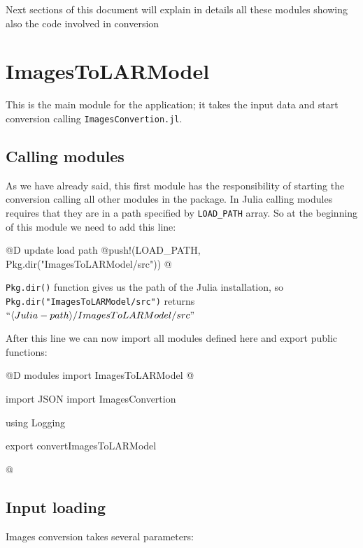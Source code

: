 \documentclass[11pt,oneside]{article}	%
\begin{document}
Next sections of this document will explain in details all these modules showing also the code involved in conversion


\section{ImagesToLARModel}\label{sec:ImagesToLARModel}

This is the main module for the application; it takes the input data and start conversion calling \texttt{ImagesConvertion.jl}.

\subsection{Calling modules}\label{sec:modules}

As we have already said, this first module has the responsibility of starting the conversion calling all other modules in the package. In Julia calling modules requires that they are in a path specified by \texttt{LOAD\_PATH} array.
So at the beginning of this module we need to add this line:

@D update load path
@{push!(LOAD_PATH, Pkg.dir("ImagesToLARModel/src"))
@}

\texttt{Pkg.dir()} function gives us the path of the Julia installation, so \texttt{Pkg.dir("ImagesToLARModel/src")} returns $``\langle Julia-path\rangle /ImagesToLARModel/src"$

After this line we can now import all modules defined here and export public functions:

@D modules import ImagesToLARModel
@{import JSON
import ImagesConvertion

using Logging

export convertImagesToLARModel

@}

\subsection{Input loading}\label{sec:input}

Images conversion takes several parameters:
\end{document}
